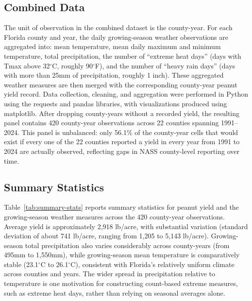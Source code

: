 \documentclass{article}
\begin{document}
\subsection{Combined Data}

The unit of observation in the combined dataset is the county-year. For each Florida county and year, the daily growing-season weather observations are aggregated into: mean temperature, mean daily maximum and minimum temperature, total precipitation, the number of ``extreme heat days'' (days with Tmax above 32$^\circ$C, roughly 90$^\circ$F), and the number of ``heavy rain days'' (days with more than 25mm of precipitation, roughly 1 inch). These aggregated weather measures are then merged with the corresponding county-year peanut yield record. Data collection, cleaning, and aggregation were performed in Python using the requests and pandas libraries, with visualizations produced using matplotlib.
\newline After dropping county-years without a recorded yield, the resulting panel contains 420 county-year observations across 22 counties spanning 1991--2024. This panel is unbalanced: only 56.1\% of the county-year cells that would exist if every one of the 22 counties reported a yield in every year from 1991 to 2024 are actually observed, reflecting gaps in NASS county-level reporting over time.

\subsection{Summary Statistics}

Table~\ref{tab:summary-stats} reports summary statistics for peanut yield and the growing-season weather measures across the 420 county-year observations. Average yield is approximately 2,918 lb/acre, with substantial variation (standard deviation of about 741 lb/acre, ranging from 1,205 to 5,143 lb/acre). Growing-season total precipitation also varies considerably across county-years (from 495mm to 1,550mm), while growing-season mean temperature is comparatively stable (23.1$^\circ$C to 26.1$^\circ$C), consistent with Florida's relatively uniform climate across counties and years. The wider spread in precipitation relative to temperature is one motivation for constructing count-based extreme measures, such as extreme heat days, rather than relying on seasonal averages alone.
\end{document}

